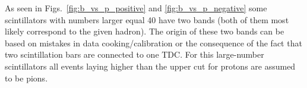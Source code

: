 As seen in Figs.~\ref{fig:b_vs_p_positive} and \ref{fig:b_vs_p_negative} some scintillators with numbers larger equal 40 have two bands (both of them most likely correspond to 
the given hadron). The origin of these two bands can be based on mistakes in data cooking/calibration or the consequence of the fact that two scintillation bars are connected to one TDC. For this large-number scintillators all events laying higher than the upper cut for protons are assumed to be pions.



